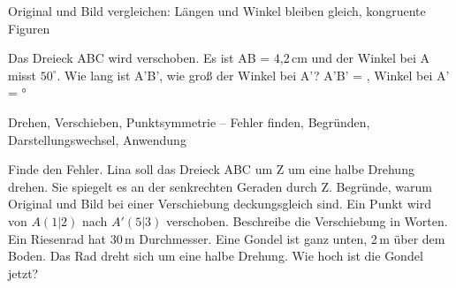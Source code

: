 \begin{aufgabe}{Original und Bild vergleichen: Längen und Winkel bleiben gleich, kongruente Figuren}
\begin{teile}
\teil Das Dreieck ABC wird verschoben. Es ist AB = 4{,}2\,cm und der Winkel bei A misst $50^\circ$. Wie lang ist A'B', wie groß der Winkel bei A'? A'B' = \leerfeld[cm] , Winkel bei A' = \leerfeld °
\end{teile}
\end{aufgabe}

\begin{aufgabe}{Drehen, Verschieben, Punktsymmetrie – Fehler finden, Begründen, Darstellungswechsel, Anwendung}
\begin{teile}
\teil Finde den Fehler. Lina soll das Dreieck ABC um Z um eine halbe Drehung drehen. Sie spiegelt es an der senkrechten Geraden durch Z.
\teil Begründe, warum Original und Bild bei einer Verschiebung deckungsgleich sind.
\teil Ein Punkt wird von $A(1|2)$ nach $A'(5|3)$ verschoben. Beschreibe die Verschiebung in Worten.
\teil Ein Riesenrad hat 30\,m Durchmesser. Eine Gondel ist ganz unten, 2\,m über dem Boden. Das Rad dreht sich um eine halbe Drehung. Wie hoch ist die Gondel jetzt? \leerfeld[m]
\end{teile}
\end{aufgabe}
